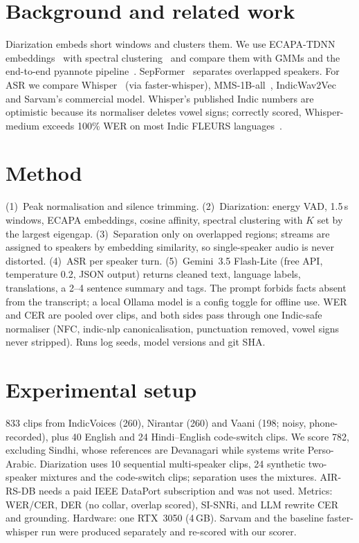 \documentclass[11pt,a4paper,twocolumn]{article}
\begin{document}
\section{Background and related work}
Diarization embeds short windows and clusters them. We use ECAPA-TDNN embeddings~\cite{ecapa}
with spectral clustering~\cite{ng2001spectral} and compare them with GMMs and the end-to-end
pyannote pipeline~\cite{pyannote}. SepFormer~\cite{sepformer} separates overlapped speakers. For
ASR we compare Whisper~\cite{whisper} (via faster-whisper), MMS-1B-all~\cite{mms}, IndicWav2Vec
and Sarvam's commercial model. Whisper's published Indic numbers are optimistic because its
normaliser deletes vowel signs; correctly scored, Whisper-medium exceeds 100\% WER on most Indic
FLEURS languages~\cite{thennal}.

\section{Method}
(1)~Peak normalisation and silence trimming. (2)~Diarization: energy VAD, 1.5\,s windows, ECAPA
embeddings, cosine affinity, spectral clustering with $K$ set by the largest eigengap.
(3)~Separation only on overlapped regions; streams are assigned to speakers by embedding
similarity, so single-speaker audio is never distorted. (4)~ASR per speaker turn. (5)~Gemini~3.5
Flash-Lite (free API, temperature 0.2, JSON output) returns cleaned text, language labels,
translations, a 2--4 sentence summary and tags. The prompt forbids facts absent from the
transcript; a local Ollama model is a config toggle for offline use. WER and CER are pooled over
clips, and both sides pass through one Indic-safe normaliser (NFC, indic-nlp canonicalisation,
punctuation removed, vowel signs never stripped). Runs log seeds, model versions and git SHA.

\section{Experimental setup}
833 clips from IndicVoices (260), Nirantar (260) and Vaani (198; noisy, phone-recorded), plus 40
English and 24 Hindi--English code-switch clips. We score 782, excluding Sindhi, whose
references are Devanagari while systems write Perso-Arabic. Diarization uses 10 sequential
multi-speaker clips, 24 synthetic two-speaker mixtures and the code-switch clips; separation uses
the mixtures. AIR-RS-DB needs a paid IEEE DataPort subscription and was not used. Metrics:
WER/CER, DER (no collar, overlap scored), SI-SNRi, and LLM rewrite CER and grounding.
Hardware: one RTX~3050 (4\,GB). Sarvam and the baseline faster-whisper run were produced
separately and re-scored with our scorer.
\end{document}
